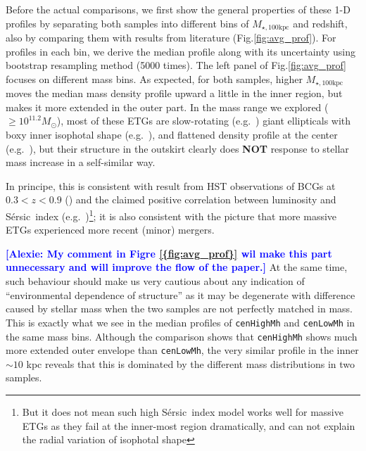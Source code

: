 \documentclass{emulateapj}
\def\ser{{S\'{e}rsic\ }}
\def\rbcg{\texttt{cenHighMh}}
\def\nbcg{\texttt{cenLowMh}}
\def\mtot{{$M_{\star,100\mathrm{kpc}}$}}
\newcommand{\alexie}[1]{\textcolor{blue}{\textbf{[Alexie: #1]}}}
\begin{document}
\begin{CJK*}{UTF8}{gbsn}
    Before the actual comparisons, we first show the general properties 
    of these 1-D profiles by separating both samples into different bins 
    of \mtot{} and redshift, also by comparing them with results from 
    literature (Fig.\ref{fig:avg_prof}).   
    For profiles in each bin, we derive the median profile along with its 
    uncertainty using bootstrap resampling method (5000 times). 
    The left panel of Fig.\ref{fig:avg_prof} focuses on different mass bins.  
    As expected, for both samples, higher \mtot{} moves the median mass 
    density profile upward a little in the inner region, but makes it 
    more extended in the outer part.
    In the mass range we explored ($\ge 10^{11.2} M_{\odot}$), most of these 
    ETGs are slow-rotating (e.g.\ \citealt{Cappellari13b}) giant ellipticals 
    with boxy inner isophotal shape (e.g.\ \citealt{Kormendy2009}), and 
    flattened density profile at the center (e.g.\ \citealt{Lauer07}), 
    but their structure in the outskirt clearly does \textbf{NOT} response 
    to stellar mass increase in a self-similar way. 
    
    In principe, this is consistent with result from HST observations of 
    BCGs at $0.3 < z <0.9$ (\citealt{Bai2014}) and the claimed positive 
    correlation between luminosity and \ser index
    (e.g.\ \citealt{Savorgnan13})\footnote{But it does not mean such high 
    \ser index model works well for massive ETGs as they fail at the inner-most 
    region dramatically, and can not explain the radial variation of 
    isophotal shape}; it is also consistent with the picture that more 
    massive ETGs experienced more recent (minor) mergers.  
    
\alexie{My comment in Figre \ref{{fig:avg_prof}} wil make this part unnecessary and will improve the flow of the paper.}    At the same time, such behaviour should make us very cautious about 
    any indication of ``environmental dependence of structure'' as it 
    may be degenerate with difference caused by stellar mass when the 
    two samples are not perfectly matched in mass.  
    This is exactly what we see in the median profiles of \rbcg{}
    and \nbcg{} in the same mass bins. 
    Although the comparison shows that \rbcg{} shows much more 
    extended outer envelope than \nbcg{}, the very similar profile
    in the inner $\sim 10$ kpc reveals that this is dominated by the 
    different mass distributions in two samples. 
    

\end{CJK*}
\end{document}
